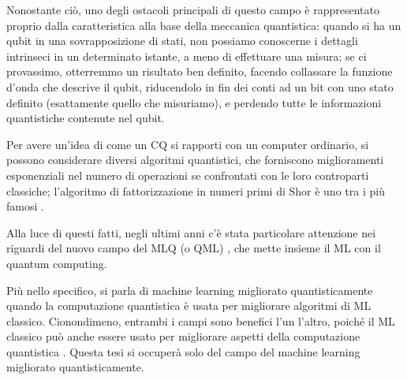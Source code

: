 
Nonostante ciò, uno degli ostacoli principali di questo campo è rappresentato proprio dalla 
caratteristica alla base della meccanica quantistica: quando si ha un qubit 
in una sovrapposizione di stati, non possiamo conoscerne i dettagli intrinseci 
in un determinato istante, a meno di effettuare una misura; se ci provassimo, 
otterremmo un risultato ben definito, facendo collassare la funzione d'onda 
che descrive il qubit, riducendolo in fin dei conti ad un bit con uno stato definito (esattamente 
quello che misuriamo), e perdendo tutte le informazioni quantistiche 
contenute nel qubit. 


Per avere un'idea di come un \ac{CQ} si rapporti con un computer ordinario, 
si possono considerare diversi algoritmi quantistici, che forniscono 
miglioramenti esponenziali nel numero di operazioni se confrontati con le loro controparti classiche; 
l'algoritmo di fattorizzazione in numeri primi di Shor è uno tra i più famosi \cite{shor}. 


Alla luce di questi fatti, negli ultimi anni c'è stata particolare attenzione nei 
riguardi del nuovo campo del \ac{MLQ} (o \ac{QML}) \cite{Biamonte2017} , che mette insieme il 
\ac{ML} con il quantum computing. 

Più nello specifico, si parla di machine learning migliorato quantisticamente quando 
la computazione quantistica è usata per migliorare algoritmi di \ac{ML} classico. 
Cionondimeno, entrambi i campi sono benefici l'un l'altro, 
poiché il \ac{ML} classico può anche essere usato per migliorare aspetti 
della computazione quantistica \cite{PhysRevLett.116.230504}. 
Questa tesi si occuperà solo del campo del machine 
learning migliorato quantisticamente. 

